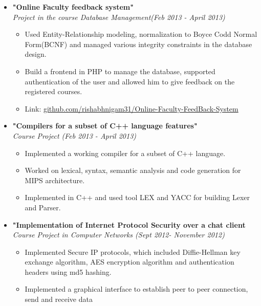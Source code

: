 \documentclass[margin,line]{resume}
\begin{document}
\begin{resume}
\begin{itemize}
    \item \large{\textbf{\textsf{"Online Faculty feedback system"}}}
      \\ \small{\textit{Project in the course Database Management(Feb 2013 - April 2013)}}
      \normalsize
      \begin{itemize}
      \item Used Entity-Relationship modeling, normalization to Boyce Codd Normal Form(BCNF) and managed various integrity constraints in the database design.
      \item Build a frontend in PHP to manage the database, supported authentication of the user and allowed him to give feedback on the registered courses.
      \item Link: \href{https://github.com/rishabhnigam31/Online-Faculty-FeedBack-System}{github.com/rishabhnigam31/Online-Faculty-FeedBack-System}
      \end{itemize}

    \item \large{\textbf{\textsf{"Compilers for a subset of C++ language features"}}}
      \\ \small{\textit{Course Project (Feb 2013 - April 2013)}}
      \normalsize
      \begin{itemize}
      \item Implemented a working compiler for a subset of C++ language.
      \item Worked on lexical, syntax, semantic analysis and code generation for MIPS architecture.
      \item Implemented in C++ and used tool LEX and YACC for building Lexer and Parser.
      \end{itemize}

    \item \large{\textbf{\textsf{"Implementation of Internet Protocol Security over a chat client}}}
      \\ \small{\textit{Course Project in Computer Networks (Sept 2012- November 2012)}}
      \normalsize
      \begin{itemize}
      \item Implemented Secure IP protocols, which included Diffie-Hellman key exchange algorithm, AES encryption
        algorithm and authentication headers using md5 hashing.
      \item Implemented a graphical interface to establish peer to peer connection, send and receive data 
      \end{itemize}


\end{itemize}
\end{resume}
\end{document}

